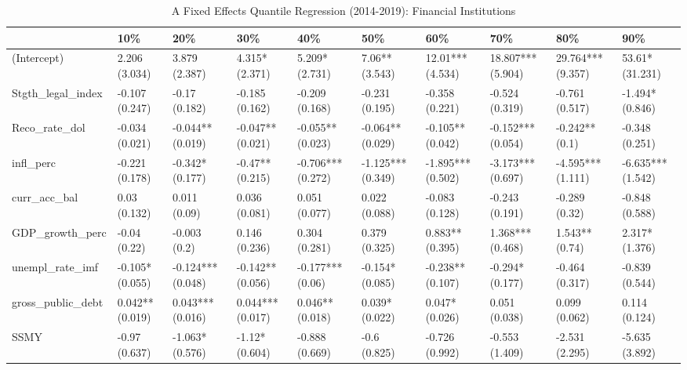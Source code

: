 \begin{table}[ht]
\centering
\caption{A Fixed Effects Quantile Regression (2014-2019): Financial Institutions} 
\begingroup\small
\begin{tabular}{llllllllll}
  \toprule
 & 10\% & 20\% & 30\% & 40\% & 50\% & 60\% & 70\% & 80\% & 90\% \\ 
  \midrule
(Intercept) & 2.206 (3.034) & 3.879 (2.387) & 4.315* (2.371) & 5.209* (2.731) & 7.06** (3.543) & 12.01*** (4.534) & 18.807*** (5.904) & 29.764*** (9.357) & 53.61* (31.231) \\ 
  Stgth\_legal\_index & -0.107 (0.247) & -0.17 (0.182) & -0.185 (0.162) & -0.209 (0.168) & -0.231 (0.195) & -0.358 (0.221) & -0.524 (0.319) & -0.761 (0.517) & -1.494* (0.846) \\ 
  Reco\_rate\_dol & -0.034 (0.021) & -0.044** (0.019) & -0.047** (0.021) & -0.055** (0.023) & -0.064** (0.029) & -0.105** (0.042) & -0.152*** (0.054) & -0.242** (0.1) & -0.348 (0.251) \\ 
  infl\_perc & -0.221 (0.178) & -0.342* (0.177) & -0.47** (0.215) & -0.706*** (0.272) & -1.125*** (0.349) & -1.895*** (0.502) & -3.173*** (0.697) & -4.595*** (1.111) & -6.635*** (1.542) \\ 
  curr\_acc\_bal & 0.03 (0.132) & 0.011 (0.09) & 0.036 (0.081) & 0.051 (0.077) & 0.022 (0.088) & -0.083 (0.128) & -0.243 (0.191) & -0.289 (0.32) & -0.848 (0.588) \\ 
  GDP\_growth\_perc & -0.04 (0.22) & -0.003 (0.2) & 0.146 (0.236) & 0.304 (0.281) & 0.379 (0.325) & 0.883** (0.395) & 1.368*** (0.468) & 1.543** (0.74) & 2.317* (1.376) \\ 
  unempl\_rate\_imf & -0.105* (0.055) & -0.124*** (0.048) & -0.142** (0.056) & -0.177*** (0.06) & -0.154* (0.085) & -0.238** (0.107) & -0.294* (0.177) & -0.464 (0.317) & -0.839 (0.544) \\ 
  gross\_public\_debt & 0.042** (0.019) & 0.043*** (0.016) & 0.044*** (0.017) & 0.046** (0.018) & 0.039* (0.022) & 0.047* (0.026) & 0.051 (0.038) & 0.099 (0.062) & 0.114 (0.124) \\ 
  SSMY & -0.97 (0.637) & -1.063* (0.576) & -1.12* (0.604) & -0.888 (0.669) & -0.6 (0.825) & -0.726 (0.992) & -0.553 (1.409) & -2.531 (2.295) & -5.635 (3.892) \\ 
   \bottomrule
\end{tabular}
\endgroup
\end{table}
